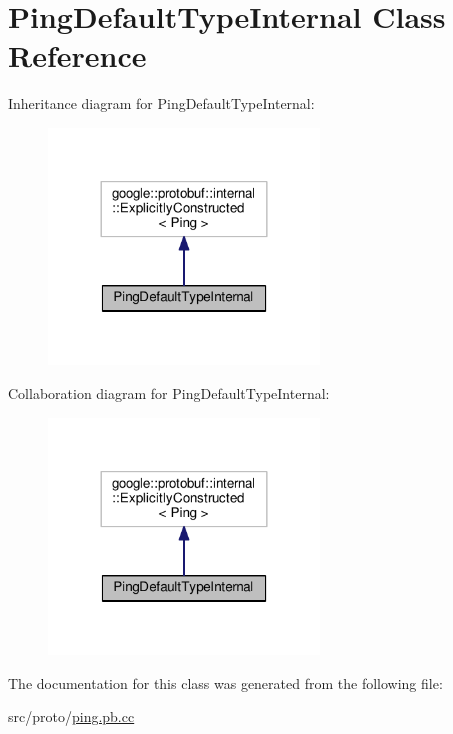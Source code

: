 \hypertarget{class_ping_default_type_internal}{}\section{Ping\+Default\+Type\+Internal Class Reference}
\label{class_ping_default_type_internal}


Inheritance diagram for Ping\+Default\+Type\+Internal\+:
\nopagebreak
\begin{figure}[H]
\begin{center}
\leavevmode
\includegraphics[width=204pt]{class_ping_default_type_internal__inherit__graph}
\end{center}
\end{figure}


Collaboration diagram for Ping\+Default\+Type\+Internal\+:
\nopagebreak
\begin{figure}[H]
\begin{center}
\leavevmode
\includegraphics[width=204pt]{class_ping_default_type_internal__coll__graph}
\end{center}
\end{figure}


The documentation for this class was generated from the following file\+:\begin{DoxyCompactItemize}
\item 
src/proto/\hyperlink{ping_8pb_8cc}{ping.\+pb.\+cc}\end{DoxyCompactItemize}
